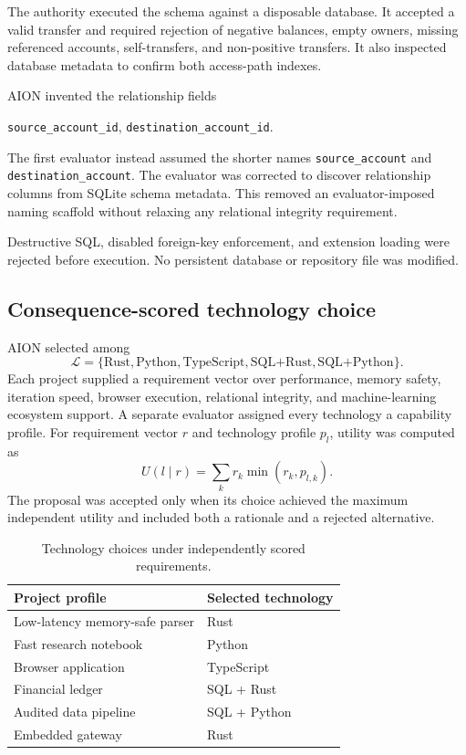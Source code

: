 The authority executed the schema against a disposable database.  It accepted a
valid transfer and required rejection of negative balances, empty owners,
missing referenced accounts, self-transfers, and non-positive transfers.  It
also inspected database metadata to confirm both access-path indexes.

AION invented the relationship fields
\begin{center}
\texttt{source\_account\_id},\qquad
\texttt{destination\_account\_id}.
\end{center}
The first evaluator instead assumed the shorter names
\texttt{source\_account} and \texttt{destination\_account}.  The evaluator was
corrected to discover relationship columns from SQLite schema metadata.  This
removed an evaluator-imposed naming scaffold without relaxing any relational
integrity requirement.

Destructive SQL, disabled foreign-key enforcement, and extension loading were
rejected before execution.  No persistent database or repository file was
modified.

\subsection{Consequence-scored technology choice}

AION selected among
\begin{equation}
\mathcal{L} =
\{\text{Rust},\text{Python},\text{TypeScript},
  \text{SQL+Rust},\text{SQL+Python}\}.
\end{equation}
Each project supplied a requirement vector over performance, memory safety,
iteration speed, browser execution, relational integrity, and machine-learning
ecosystem support.  A separate evaluator assigned every technology a capability
profile.  For requirement vector $r$ and technology profile $p_l$, utility was
computed as
\begin{equation}
U(l\mid r)=\sum_{k} r_k\min(r_k,p_{l,k}).
\label{eq:technology-utility}
\end{equation}
The proposal was accepted only when its choice achieved the maximum independent
utility and included both a rationale and a rejected alternative.

\begin{table}[ht]
\centering
\caption{Technology choices under independently scored requirements.}
\label{tab:technology-choices}
\begin{tabular}{ll}
\hline
Project profile & Selected technology \\
\hline
Low-latency memory-safe parser & Rust \\
Fast research notebook & Python \\
Browser application & TypeScript \\
Financial ledger & SQL + Rust \\
Audited data pipeline & SQL + Python \\
Embedded gateway & Rust \\
\hline
\end{tabular}
\end{table}

